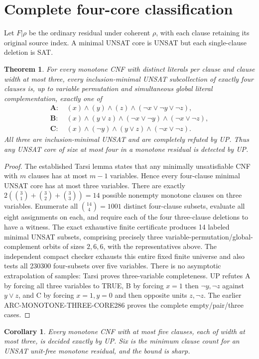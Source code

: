 \documentclass[11pt]{article}
\newtheorem{theorem}{Theorem}
\newtheorem{corollary}{Corollary}
\begin{document}
\section{Complete four-core classification}
Let $F|\rho$ be the ordinary residual under coherent $\rho$, with each clause retaining its original source index. A minimal UNSAT core is UNSAT but each single-clause deletion is SAT.
\begin{theorem}
For every monotone CNF with distinct literals per clause and clause width at most three, every inclusion-minimal UNSAT subcollection of exactly four clauses is, up to variable permutation and simultaneous global literal complementation, exactly one of
\begin{align*}
\mathbf A:\ &(x)\land(y)\land(z)\land(\neg x\lor\neg y\lor\neg z),\\
\mathbf B:\ &(x)\land(y\lor z)\land(\neg x\lor\neg y)\land(\neg x\lor\neg z),\\
\mathbf C:\ &(x)\land(\neg y)\land(y\lor z)\land(\neg x\lor\neg z).
\end{align*}
All three are inclusion-minimal UNSAT and are completely refuted by UP. Thus any UNSAT core of size at most four in a monotone residual is detected by UP.
\end{theorem}
\begin{proof}
The established Tarsi lemma states that any minimally unsatisfiable CNF with $m$ clauses has at most $m-1$ variables. Hence every four-clause minimal UNSAT core has at most three variables. There are exactly $2(\binom31+\binom32+\binom33)=14$ possible nonempty monotone clauses on three variables. Enumerate all $\binom{14}{4}=1001$ distinct four-clause subsets, evaluate all eight assignments on each, and require each of the four three-clause deletions to have a witness. The exact exhaustive finite certificate produces 14 labeled minimal UNSAT subsets, comprising precisely three variable-permutation/global-complement orbits of sizes $2,6,6$, with the representatives above. The independent compact checker exhausts this entire fixed finite universe and also tests all 230300 four-subsets over five variables. There is no asymptotic extrapolation of samples: Tarsi proves three-variable completeness. UP refutes A by forcing all three variables to TRUE, B by forcing $x=1$ then $\neg y,\neg z$ against $y\lor z$, and C by forcing $x=1,y=0$ and then opposite units $z,\neg z$. The earlier ARC-MONOTONE-THREE-CORE286 proves the complete empty/pair/three cases.
\end{proof}
\begin{corollary}
Every monotone CNF with at most five clauses, each of width at most three, is decided exactly by UP. Six is the minimum clause count for an UNSAT unit-free monotone residual, and the bound is sharp.
\end{corollary}
\end{document}
